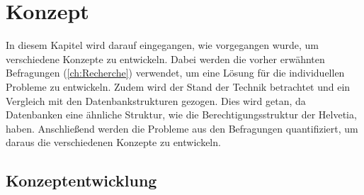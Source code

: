 \chapter{Konzept}
\label{ch:chapter04}
In diesem Kapitel wird darauf eingegangen, wie vorgegangen wurde, um verschiedene Konzepte zu entwickeln.
Dabei werden die vorher erwähnten Befragungen (\ref{ch:Recherche}) verwendet, um eine Lösung für die individuellen Probleme zu entwickeln.
Zudem wird der Stand der Technik betrachtet und ein Vergleich mit den Datenbankstrukturen gezogen.
Dies wird getan, da Datenbanken eine ähnliche Struktur, wie die Berechtigungsstruktur der Helvetia, haben. 
Anschließend werden die Probleme aus den Befragungen quantifiziert, um daraus die verschiedenen Konzepte zu entwickeln.


\section{Konzeptentwicklung}
\label{sec:chapter04:Konzeptentwicklung}

